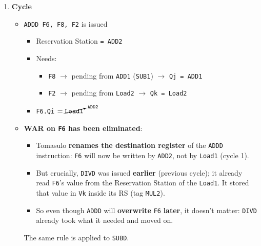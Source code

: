 \begin{enumerate}
    \item \textbf{Cycle \theenumi}
    \begin{itemize}
        \item \texttt{ADDD F6, F8, F2} is issued
        \begin{itemize}
            \item Reservation Station \texttt{= ADD2}
            \item Needs:
            \begin{itemize}
                \item \texttt{F8} $\rightarrow$ pending from \texttt{ADD1} (\texttt{SUB1}) $\rightarrow$ \texttt{Qj = ADD1}
                \item \texttt{F2} $\rightarrow$ pending from \texttt{Load2} $\rightarrow$ \texttt{Qk = Load2}
            \end{itemize}
            \item \texttt{F6.Qi} $= \cancelto{\texttt{ADD2}}{\texttt{Load1}}$
        \end{itemize}
        \item \textbf{WAR on \texttt{F6} has been eliminated}:
        \begin{itemize}
            \item Tomasulo \textbf{renames the destination register} of the \texttt{ADDD} instruction: \texttt{F6} will now be written by \texttt{ADD2}, not by \texttt{Load1} (cycle 1).
            \item But crucially, \texttt{DIVD} was issued \textbf{earlier} (previous cycle); it already read \texttt{F6}'s value from the Reservation Station of the \texttt{Load1}. It stored that value in \texttt{Vk} inside its RS (tag \texttt{MUL2}).
            \item So even though \texttt{ADDD} will \textbf{overwrite} \texttt{F6} \textbf{later}, it doesn't matter: \texttt{DIVD} already took what it needed and moved on.
        \end{itemize}
        The same rule is applied to \texttt{SUBD}.
    \end{itemize}


\end{enumerate}
